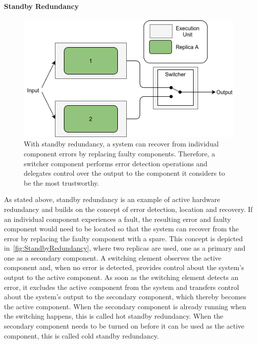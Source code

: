 \paragraph{Standby Redundancy}
\begin{figure}[!hb]
	\centering
	\includegraphics[width=0.75\linewidth]{images/ActiveSelectionRedundancy}
	\caption{With standby redundancy, a system can recover from individual component errors by replacing faulty components. Therefore, a switcher component performs error detection operations and delegates control over the output to the component it considers to be the most trustworthy.}
	\label{fig:StandbyRedundancy}
\end{figure}

As stated above, standby redundancy is an example of active hardware redundancy and builds on the concept of error detection, location and recovery.
If an individual component experiences a fault, the resulting error and faulty component would need to be located so that the system can recover from the error by replacing the faulty component with a spare.
This concept is depicted in~\autoref{fig:StandbyRedundancy}, where two replicas are used, one as a primary and one as a secondary component.
A switching element observes the active component and, when no error is detected, provides control about the system's output to the active component.
As soon as the switching element detects an error, it excludes the active component from the system and transfers control about the system's output to the secondary component, which thereby becomes the active component.
When the secondary component is already running when the switching happens, this is called hot standby redundancy.
When the secondary component needs to be turned on before it can be used as the active component, this is called cold standby redundancy.

